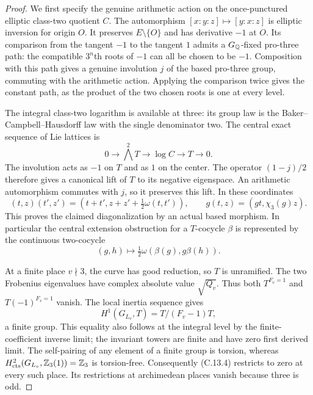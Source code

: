\begin{proof}
We first specify the genuine arithmetic action on the
once-punctured elliptic class-two quotient $C$. The
automorphism $[x:y:z]\mapsto[y:x:z]$ is elliptic inversion
for origin $O$. It preserves $E\setminus\{O\}$ and has
derivative $-1$ at $O$. Its comparison from the tangent
$-1$ to the tangent $1$ admits a $G_\mathbb Q$-fixed pro-three
path: the compatible $3^n$th roots of $-1$ can all be
chosen to be $-1$. Composition with this path gives a
genuine involution $j$ of the based pro-three group,
commuting with the arithmetic action. Applying the
comparison twice gives the constant path, as the product
of the two chosen roots is one at every level.

The integral class-two logarithm is available at three:
its group law is the Baker--Campbell--Hausdorff law with
the single denominator two. The central exact sequence
of Lie lattices is
\[
 0\longrightarrow\bigwedge^2T\longrightarrow\log C
       \longrightarrow T\longrightarrow0.
\]
The involution acts as $-1$ on $T$ and as $1$ on the
center. The operator $(1-j)/2$ therefore gives a
canonical lift of $T$ to its negative eigenspace.
An arithmetic automorphism commutes with $j$, so it
preserves this lift. In these coordinates
\[
 (t,z)(t',z')=(t+t',z+z'+\tfrac12\omega(t,t')),
 \qquad g(t,z)=(g t,\chi_3(g)z).
 \tag{C.13.3}
\]
This proves the claimed diagonalization by an actual
based morphism. In particular the central extension
obstruction for a $T$-cocycle $\beta$ is represented by
the continuous two-cocycle
\[
 (g,h)\longmapsto\tfrac12\omega(\beta(g),g\beta(h)).
 \tag{C.13.4}
\]

At a finite place $v\nmid3$, the curve has good reduction,
so $T$ is unramified. The two Frobenius eigenvalues have
complex absolute value $\sqrt{Q_v}$. Thus both
$T^{F_v=1}$ and $T(-1)^{F_v=1}$ vanish. The local
inertia sequence gives
\[
 H^1(G_{L_v},T)=T/(F_v-1)T,
\]
a finite group. This equality also follows at the
integral level by the finite-coefficient inverse limit;
the invariant towers are finite and have zero first
derived limit. The self-pairing of any element of a
finite group is torsion, whereas
$H^2_{\rm cts}(G_{L_v},\mathbb Z_3(1))=\mathbb Z_3$ is torsion-free.
Consequently (C.13.4) restricts to zero at every such
place. Its restrictions at archimedean places vanish
because three is odd.


\end{proof}
